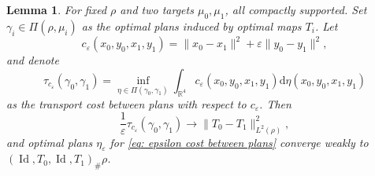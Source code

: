 \documentclass[11pt, oneside, titlepage]{book}
\theoremstyle{plain}
\newtheorem{lemma}[theorem]{Lemma}
\theoremstyle{definition}
\newcommand{\R}{\mathbb{R}}
\newcommand{\di}{\mathrm{d}}
\DeclareMathOperator{\id}{Id}
\begin{document}
\begin{lemma}
\label{lem: plan converges to LOT distance}
For fixed $\rho$ and two targets $\mu_0, \mu_1$, all compactly supported. Set $\gamma_i \in \Pi(\rho, \mu_i)$ as the optimal plans induced by optimal maps $T_i$. Let 
\begin{equation*}
    c_\varepsilon(x_0, y_0, x_1, y_1) = \|x_0 - x_1\|^2 + \varepsilon \|y_0 - y_1\|^2,
\end{equation*}
and denote
\begin{equation}
\label{eq: epsilon cost between plans}
    \tau_{c_\varepsilon}(\gamma_0, \gamma_1) = \inf_{\eta \in \Pi(\gamma_0, \gamma_1)} \int_{\R^4} c_\varepsilon(x_0, y_0, x_1, y_1) \di \eta(x_0, y_0, x_1, y_1)
\end{equation}
as the transport cost between plans with respect to $c_{\varepsilon}$. Then
\begin{equation*}
    \frac{1}{\varepsilon} \tau_{c_\varepsilon}(\gamma_0, \gamma_1) \to \| T_0 - T_1 \|^2_{L^2(\rho)},
\end{equation*}
and optimal plans $\eta_\varepsilon$ for \eqref{eq: epsilon cost between plans} converge weakly to $(\id, T_0, \id, T_1)_\#\rho$.
\end{lemma}
\end{document}
